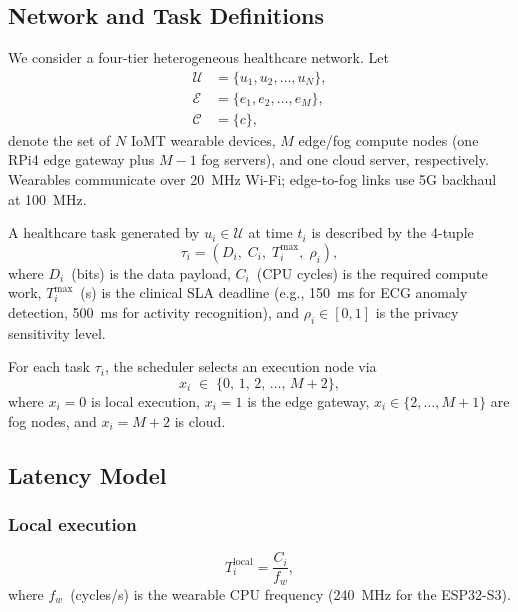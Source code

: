 \documentclass[journal]{IEEEtran}
\newcommand{\set}[1]{\mathcal{#1}}
\begin{document}
\subsection{Network and Task Definitions}
\label{subsec:network}

We consider a four-tier heterogeneous healthcare network. Let
\begin{align}
  \set{U} &= \{u_1, u_2, \ldots, u_N\}, \label{eq:set_U}\\
  \set{E} &= \{e_1, e_2, \ldots, e_M\}, \label{eq:set_E}\\
  \set{C} &= \{c\},                      \label{eq:set_C}
\end{align}
denote the set of $N$ IoMT wearable devices, $M$ edge/fog compute nodes
(one RPi4 edge gateway plus $M-1$ fog servers), and one cloud server,
respectively. Wearables communicate over 20~MHz Wi-Fi; edge-to-fog
links use 5G backhaul at 100~MHz.

A healthcare task generated by $u_i \in \set{U}$ at time $t_i$ is
described by the 4-tuple
\begin{equation}
  \tau_i = \left(D_i,\; C_i,\; T^{\max}_i,\; \rho_i\right),
  \label{eq:task_tuple}
\end{equation}
where $D_i$~(bits) is the data payload, $C_i$~(CPU cycles) is the
required compute work, $T^{\max}_i$~(s) is the clinical SLA deadline
(e.g., 150~ms for ECG anomaly detection, 500~ms for activity
recognition), and $\rho_i \in [0,1]$ is the privacy sensitivity level.

For each task $\tau_i$, the scheduler selects an execution node via
\begin{equation}
  x_i \;\in\; \{0,\, 1,\, 2,\, \ldots,\, M+2\},
  \label{eq:decision_var}
\end{equation}
where $x_i=0$ is local execution, $x_i=1$ is the edge gateway,
$x_i \in \{2,\ldots,M+1\}$ are fog nodes, and $x_i=M+2$ is cloud.

\subsection{Latency Model}
\label{subsec:latency}

\subsubsection{Local execution}
\begin{equation}
  T^{\mathrm{local}}_i = \frac{C_i}{f_w},
  \label{eq:latency_local}
\end{equation}
where $f_w$~(cycles/s) is the wearable CPU frequency (240~MHz for the
ESP32-S3).
\end{document}
